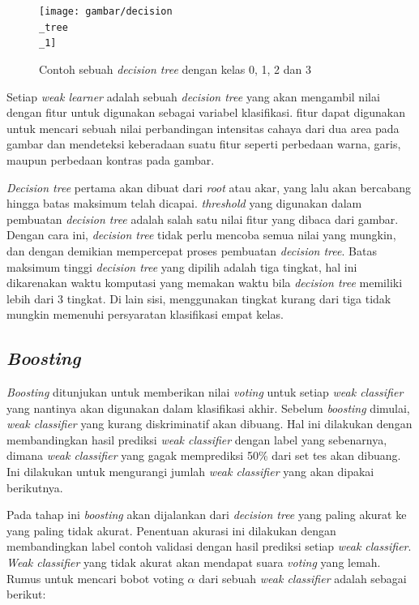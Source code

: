 \begin{figure}[H]
  \centering{}
	\texttt{[image: gambar/decision\\\_tree\\\_1]}
  \caption{Contoh sebuah \textit{decision tree} dengan kelas 0, 1, 2 dan 3}
\end{figure} 

Setiap \emph{weak learner} adalah sebuah \emph{decision tree} yang akan mengambil nilai 
dengan fitur untuk digunakan sebagai variabel klasifikasi.
fitur dapat digunakan untuk mencari 
sebuah nilai perbandingan intensitas cahaya dari dua area pada gambar dan 
mendeteksi keberadaan suatu fitur seperti 
perbedaan warna, garis, maupun perbedaan kontras pada gambar.

\textit{Decision tree} pertama akan dibuat dari \textit{root} atau akar, yang lalu 
akan bercabang hingga batas maksimum telah dicapai. \textit{threshold} yang digunakan 
dalam pembuatan \textit{decision tree} adalah salah satu nilai fitur yang dibaca dari gambar. 
Dengan cara ini, \textit{decision tree} tidak perlu mencoba semua nilai yang mungkin, dan 
dengan demikian mempercepat proses pembuatan \textit{decision tree}.
Batas maksimum tinggi \textit{decision tree }yang dipilih adalah tiga 
tingkat, hal ini dikarenakan waktu komputasi yang memakan waktu bila \textit{decision tree} 
memiliki lebih dari 3 tingkat. Di lain sisi, menggunakan tingkat kurang dari tiga tidak mungkin 
memenuhi persyaratan klasifikasi empat kelas.

\subsection{\emph{Boosting}}

\emph{Boosting} ditunjukan untuk memberikan nilai \emph{voting} untuk setiap \textit{weak classifier} 
yang nantinya akan digunakan dalam klasifikasi akhir. Sebelum \emph{boosting} dimulai, 
\textit{weak classifier} yang kurang diskriminatif akan dibuang. Hal ini dilakukan dengan 
membandingkan hasil prediksi \textit{weak classifier} dengan label yang sebenarnya, dimana 
\textit{weak classifier} yang gagak memprediksi 50\% dari set tes akan dibuang. Ini dilakukan 
untuk mengurangi jumlah \textit{weak classifier} yang akan dipakai berikutnya.

Pada tahap ini \textit{boosting} 
akan dijalankan dari \textit{decision tree} yang paling akurat ke yang paling tidak akurat. Penentuan 
akurasi ini dilakukan dengan membandingkan label contoh validasi dengan hasil prediksi setiap \textit{weak classifier}. 
\textit{Weak classifier} yang tidak akurat akan mendapat suara \textit{voting} yang lemah. Rumus untuk mencari 
bobot voting \( \alpha \) dari sebuah \textit{weak classifier} adalah sebagai berikut:

